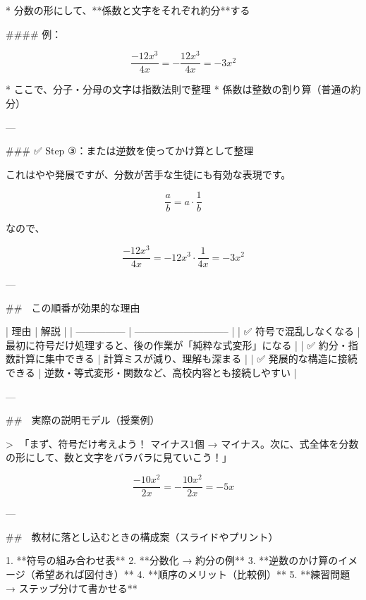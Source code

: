\documentclass{jsarticle}
\begin{document}
* 分数の形にして、**係数と文字をそれぞれ約分**する

#### 例：

$$
\frac{-12x^3}{4x} = - \frac{12x^3}{4x} = -3x^2
$$

* ここで、分子・分母の文字は指数法則で整理
* 係数は整数の割り算（普通の約分）

---

### ✅ Step ③：または逆数を使ってかけ算として整理

これはやや発展ですが、分数が苦手な生徒にも有効な表現です。

$$
\frac{a}{b} = a \cdot \frac{1}{b}
$$

なので、

$$
\frac{-12x^3}{4x} = -12x^3 \cdot \frac{1}{4x} = -3x^2
$$

---

## 🔷 この順番が効果的な理由

| 理由              | 解説                            |
| --------------- | ----------------------------- |
| ✅ 符号で混乱しなくなる    | 最初に符号だけ処理すると、後の作業が「純粋な式変形」になる |
| ✅ 約分・指数計算に集中できる | 計算ミスが減り、理解も深まる                |
| ✅ 発展的な構造に接続できる  | 逆数・等式変形・関数など、高校内容とも接続しやすい     |

---

## 🔷 実際の説明モデル（授業例）

> 💬「まず、符号だけ考えよう！ マイナス1個 → マイナス。次に、式全体を分数の形にして、数と文字をバラバラに見ていこう！」

$$
\frac{-10x^2}{2x} = - \frac{10x^2}{2x} = -5x
$$

---

## 🔷 教材に落とし込むときの構成案（スライドやプリント）

1. **符号の組み合わせ表**
2. **分数化 → 約分の例**
3. **逆数のかけ算のイメージ（希望あれば図付き）**
4. **順序のメリット（比較例）**
5. **練習問題 → ステップ分けて書かせる**
\end{document}
